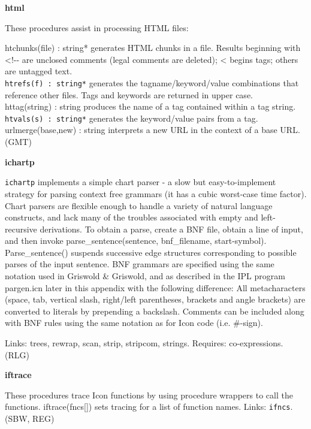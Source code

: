 {\sffamily\bfseries
html}

These procedures assist in processing HTML files:

\textsf{htchunks(file) : string*} generates HTML chunks in a
file. Results beginning with {\textless}!-{}- are unclosed comments
(legal comments are deleted); {\textless} begins tags; others are
untagged text.\\
\texttt{htrefs(f) : string*} generates the tagname/keyword/value
combinations that reference other files. Tags and
keywords are returned in upper case.\\
\textsf{httag(string) : string} produces the name of a tag contained
within a tag string.\\
\texttt{htvals(s) : string*} generates the keyword/value pairs from a
tag.\\
\textsf{urlmerge(base,new) : string} interprets a new URL in the context
of a base URL. (GMT)

{\sffamily\bfseries
ichartp}

\texttt{ichartp} implements a simple chart
parser - a slow but easy-to-implement strategy for parsing
context free grammars (it has a cubic worst-case time factor). Chart
parsers are flexible enough to handle a variety of natural language
constructs, and lack many of the troubles associated with empty and
left-recursive derivations. To obtain a parse, create a BNF
file, obtain a line of input, and then invoke parse\_sentence(sentence,
bnf\_filename, start-symbol). Parse\_sentence() suspends successive
edge structures corresponding to possible parses of the input sentence.
BNF grammars are specified using the same notation used in Griswold \&
Griswold, and as described in the IPL program
{\textquotedbl}pargen.icn{\textquotedbl} later in this appendix with
the following difference: All metacharacters (space, tab, vertical
slash, right/left parentheses, brackets and angle brackets) are
converted to literals by prepending a backslash. Comments can be
included along with BNF rules using the same notation as for Icon code
(i.e. \#-sign).

Links: \textsf{trees, rewrap, scan, strip, stripcom, strings}. Requires:
co-expressions. (RLG)

{\sffamily\bfseries
iftrace}

These procedures trace Icon functions by using procedure
wrappers to call the functions. iftrace(fncs[]) sets tracing for a list
of function names. Links: \texttt{ifncs}. (SBW, REG)

